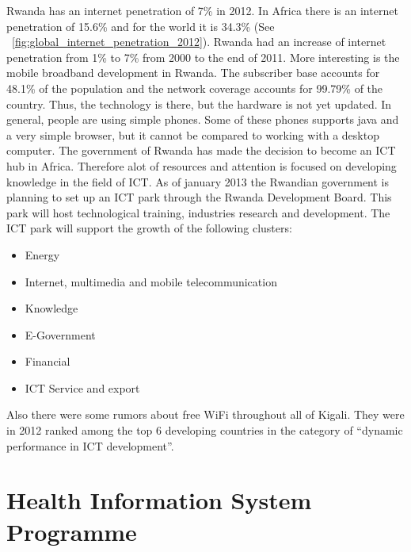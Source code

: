 Rwanda has an internet penetration of 7\% in 2012. 
In Africa there is an internet penetration of 15.6\% and for the world it is 34.3\% (See ~\ref{fig:global_internet_penetration_2012})\cite{4}. 
Rwanda had an increase of internet penetration from 1\% to 7\% from 2000 to the end of 2011\cite{2}.
More interesting is the mobile broadband development in Rwanda. 
The subscriber base accounts for 48.1\% of the population and the network coverage accounts for 99.79\% of the country.
Thus, the technology is there, but the hardware is not yet updated.
In general, people are using simple phones.
Some of these phones supports java and a very simple browser, but it cannot be compared to working with a desktop computer.
The government of Rwanda has made the decision to become an ICT hub in Africa.
Therefore alot of resources and attention is focused on developing knowledge in the field of ICT. 
As of january 2013 the Rwandian government is planning to set up an ICT park through the Rwanda Development Board.
This park will host technological training, industries research and development. The ICT park will support the growth of the following clusters:
\begin{itemize}
\item Energy
\item Internet, multimedia and mobile telecommunication
\item Knowledge
\item E-Government
\item Financial
\item ICT Service and export
\end{itemize}
\cite{2}
Also there were some rumors about free WiFi throughout all of Kigali.
They were in 2012 ranked among the top 6 developing countries in the category of ``dynamic performance in ICT development''\cite{5}.

\section{Health Information System Programme}
